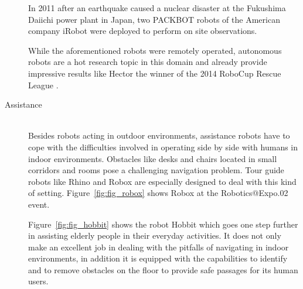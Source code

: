 \begin{description}
In 2011 after an earthquake caused a nuclear disaster at the Fukushima Daiichi power plant in Japan, two PACKBOT robots of the American company iRobot were deployed to perform on site observations.

While the aforementioned robots were remotely operated, autonomous robots are a hot research topic in this domain and already provide impressive results like Hector the winner of the 2014 RoboCup Rescue League \cite{2014:hector_rescue_tdp}.

\item[Assistance]\hfill \\
Besides robots acting in outdoor environments, assistance robots have to cope with the difficulties involved in operating side by side with humans in indoor environments. 
Obstacles like desks and chairs located in small corridors and rooms pose a challenging navigation problem.
Tour guide robots like Rhino \cite{DWA1997} and Robox \cite{philippsen:2004:phd} are especially designed to deal with this kind of setting.
Figure~\ref{fig:fig_robox} shows Robox at the Robotics@Expo.02 event. 

Figure~\ref{fig:fig_hobbit} shows the robot Hobbit \cite{fischinger2013hobbit}\cite{zagler2014roboter} which goes one step further in assisting elderly people in their everyday activities.
It does not only make an excellent job in dealing with the pitfalls of navigating in indoor environments, in addition it is equipped with the capabilities to identify and to remove obstacles on the floor to provide safe passages for its human users.


\end{description}
